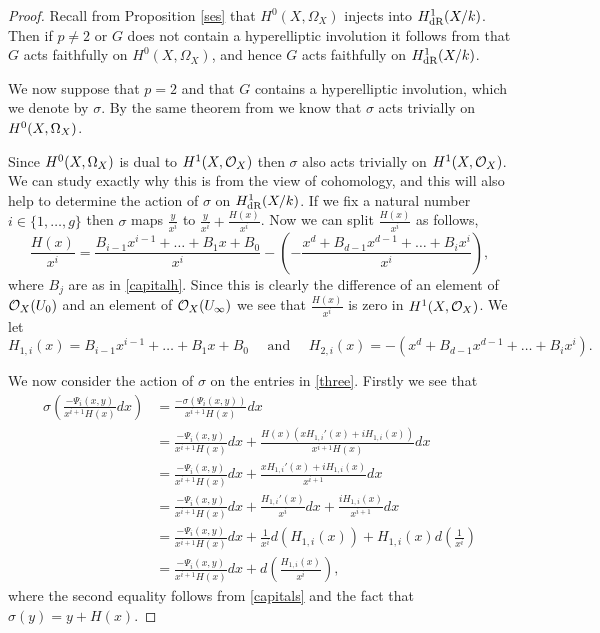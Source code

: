     \begin{proof}
    Recall from Proposition \ref{ses} that $H^0(X,\Omega_X)$ injects into $H_{\text {dR}}^1(X/k)$.
    Then if $p \neq 2$ or $G$ does not contain a hyperelliptic involution it follows from \cite[Thm. 4.2]{faithfulaction} that $G$ acts faithfully on $H^0(X,\Omega_X)$, and hence $G$ acts faithfully on $H_{\text {dR}}^1(X/k)$.
    
    We now suppose that $p=2$ and that $G$ contains a hyperelliptic involution, which we denote by $\sigma$.
    By the same theorem from \cite{faithfulaction} we know that $\sigma$ acts trivially on ${H^0(X,\Omega_X)}$.
    
    Since ${H^0(X,\Omega_X)}$ is dual to $H^1(X,\mathcal{O}_X)$ then $\sigma$ also acts trivially on $H^1(X,\mathcal{O}_X)$.
    We can study exactly why this is from the view of \cech cohomology, and this will also help to determine the action of $\sigma$ on $H_{\text {dR}}^1(X/k)$.
    If we fix a natural number $i\in \{1, \ldots ,g\}$ then $\sigma$ maps $\frac{y}{x^i}$ to $\frac{y}{x^i} + \frac{H(x)}{x^i}$. 
    Now we can split $\frac{H(x)}{x^i}$ as follows, 
        \begin{equation*}
        \frac{H(x)}{x^i} =  \frac{B_{i-1}x^{i-1} + \ldots + B_1x + B_0}{x^i} - \left( - \frac{x^d + B_{d-1}x^{d-1} + \ldots + B_ix^i}{x^i} \right),
        \end{equation*}
    where $B_j$ are as in \eqref{capitalh}.
    Since this is clearly the difference of an element of ${\cal O}_X(U_0)$ and an element of ${\cal O}_X(U_\infty)$ we see that $\frac{H(x)}{x^i}$ is zero in $H^1(X,\mathcal{O}_X)$.
    We let 
        \[
        H_{1,i}(x) = B_{i-1}x^{i-1} + \ldots + B_1x + B_0 \quad \text{ and } \quad H_{2,i}(x) = -( x^d + B_{d-1}x^{d-1} + \ldots + B_ix^i).
        \]
    
    We now consider the action of $\sigma$ on the entries in \eqref{three}.
    Firstly we see that
        \begin{align*}
        \sigma \left( \frac{-\Psi_i(x,y)}{x^{i+1}H(x)} dx\right) & = \frac{-\sigma(\Psi_i(x,y))}{x^{i+1} H(x)} dx \\
        & = \frac{-\Psi_i(x,y)}{x^{i+1}H(x)}dx + \frac{H(x)(xH_{1,i}'(x) + iH_{1,i}(x))}{x^{i+1}H(x)}dx\\
        & = \frac{-\Psi_i(x,y)}{x^{i+1}H(x)}dx + \frac{xH_{1,i}'(x) + iH_{1,i}(x)}{x^{i+1}}dx \\
        & = \frac{-\Psi_i(x,y)}{x^{i+1}H(x)}dx +  \frac{H_{1,i}'(x)}{x^i}dx + \frac{iH_{1,i}(x)}{x^{i+1}}dx \\
        & = \frac{-\Psi_i(x,y)}{x^{i+1}H(x)}dx +  \frac{1}{x^i}d\left( H_{1,i}(x) \right) + H_{1,i}(x) d \left( \frac{1}{x^i} \right) \\
        & = \frac{-\Psi_i(x,y)}{x^{i+1}H(x)}dx + d\left( \frac{H_{1,i}(x)}{x^i} \right),
        \end{align*}
    where the second equality follows from \eqref{capitals} and the fact that $\sigma(y) = y + H(x)$.
    

\end{proof}
